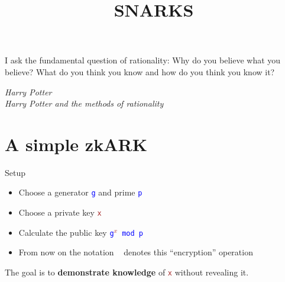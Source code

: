 \documentclass[dvipsnames]{beamer}
\newcommand{\pub}[1]{\textcolor{blue}{\texttt{#1}}}
\newcommand{\priv}[1]{\textcolor{brown}{\texttt{#1}}}
\newcommand{\enc}[1]{\colorbox{RubineRed}{\textcolor{white}{\texttt{#1}}}}
\begin{document}
    \title{SNARKS}
    \date{}

    \begin{frame}
        \maketitle

        \epigraph{I ask the fundamental question of rationality: Why do you believe what you believe? What do you think you know and how do you think you know it?}{\textit{Harry Potter\\Harry Potter and the methods of rationality}}
    \end{frame}

    \section{A simple zkARK}

    \begin{frame}{Setup}
        \begin{itemize}
            \item Choose a generator \pub{g} and prime \pub{p}
            \item Choose a private key \priv{x}
            \item Calculate the public key \pub{g\priv{$^x$} mod p}
            \item From now on the notation \enc{x} denotes this ``encryption'' operation

        \end{itemize}

        \begin{block}{}
            The goal is to \textbf{demonstrate knowledge} of \priv{x} without revealing it.
        \end{block}
    \end{frame}
\end{document}

